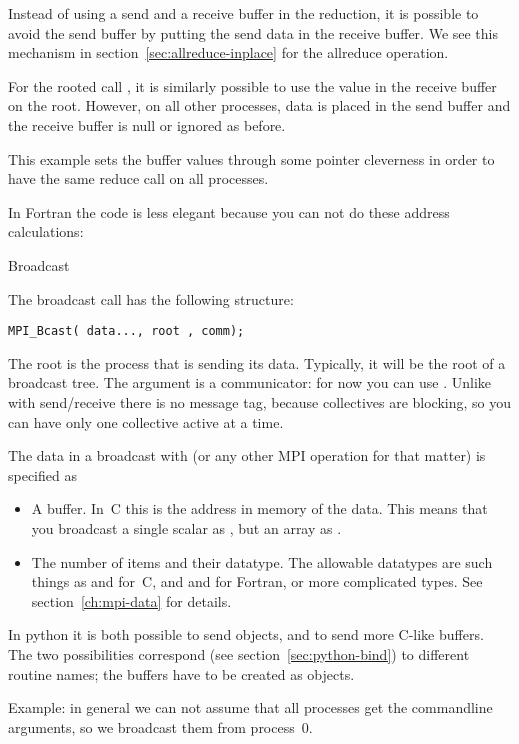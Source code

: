 Instead of using a send and a receive buffer in the reduction, it is
possible to avoid the send buffer by putting the send data in the
receive buffer. We see this mechanism
in section~\ref{sec:allreduce-inplace} for the allreduce operation.

For the rooted call , it is similarly
possible to use the value in the receive buffer on the root.
However, on all other processes, data is placed in the send buffer and
the receive buffer is null or ignored as before.

This example sets the buffer values through some pointer cleverness in
order to have the same reduce call on all processes.
%

In Fortran the code is less elegant because you can not do
these address calculations:
%

 {Broadcast}
\label{sec:bcast}

The broadcast call has the following structure:
\begin{lstlisting}
MPI_Bcast( data..., root , comm);
\end{lstlisting}
The root is the process that is sending its data.
Typically, it will be the root of a broadcast tree.
The  argument is a communicator:
for now you can use .
Unlike with send/receive there is no message tag,
because collectives are blocking, so you can have only one collective active at a
time. 

The data in a broadcast
%
with
%
(or any other MPI operation for that matter)
is specified as
\begin{itemize}
\item A buffer. In~C this is the address in memory of the data. This means
  that you broadcast a single scalar as ,
  but an array as .
\item The number of items and their datatype. The allowable datatypes
  are such things as  and  for~C, and
   and  for Fortran, or more complicated types.
  See section~\ref{ch:mpi-data} for details.
\end{itemize}
\begin{pythonnote}
  In python it is both possible to send objects, and to send more
  C-like buffers. The two possibilities correspond (see
  section~\ref{sec:python-bind}) to different routine names; the
  buffers have to be created as  objects.
\end{pythonnote}
%
Example: in general we can not assume that all processes get the
commandline arguments, so we broadcast them from process~0.

